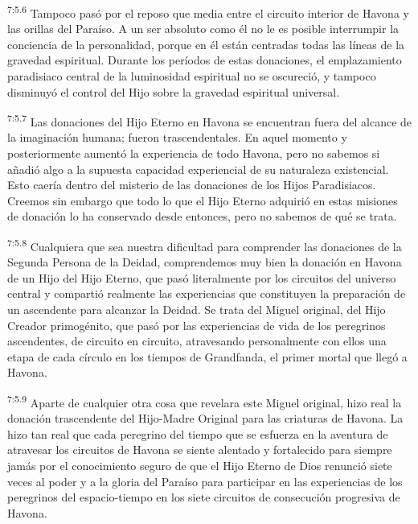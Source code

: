 \par
\textsuperscript{7:5.6} Tampoco pasó por el reposo que media entre el circuito interior de Havona y las orillas del Paraíso. A un ser absoluto como él no le es posible interrumpir la conciencia de la personalidad, porque en él están centradas todas las líneas de la gravedad espiritual. Durante los períodos de estas donaciones, el emplazamiento paradisiaco central de la luminosidad espiritual no se oscureció, y tampoco disminuyó el control del Hijo sobre la gravedad espiritual universal.

\par
\textsuperscript{7:5.7} Las donaciones del Hijo Eterno en Havona se encuentran fuera del alcance de la imaginación humana; fueron trascendentales. En aquel momento y posteriormente aumentó la experiencia de todo Havona, pero no sabemos si añadió algo a la supuesta capacidad experiencial de su naturaleza existencial. Esto caería dentro del misterio de las donaciones de los Hijos Paradisiacos. Creemos sin embargo que todo lo que el Hijo Eterno adquirió en estas misiones de donación lo ha conservado desde entonces, pero no sabemos de qué se trata.

\par
\textsuperscript{7:5.8} Cualquiera que sea nuestra dificultad para comprender las donaciones de la Segunda Persona de la Deidad, comprendemos muy bien la donación en Havona de un Hijo del Hijo Eterno, que pasó literalmente por los circuitos del universo central y compartió realmente las experiencias que constituyen la preparación de un ascendente para alcanzar la Deidad. Se trata del Miguel original, del Hijo Creador primogénito, que pasó por las experiencias de vida de los peregrinos ascendentes, de circuito en circuito, atravesando personalmente con ellos una etapa de cada círculo en los tiempos de Grandfanda, el primer mortal que llegó a Havona.

\par
\textsuperscript{7:5.9} Aparte de cualquier otra cosa que revelara este Miguel original, hizo real la donación trascendente del Hijo-Madre Original para las criaturas de Havona. La hizo tan real que cada peregrino del tiempo que se esfuerza en la aventura de atravesar los circuitos de Havona se siente alentado y fortalecido para siempre jamás por el conocimiento seguro de que el Hijo Eterno de Dios renunció siete veces al poder y a la gloria del Paraíso para participar en las experiencias de los peregrinos del espacio-tiempo en los siete circuitos de consecución progresiva de Havona.


